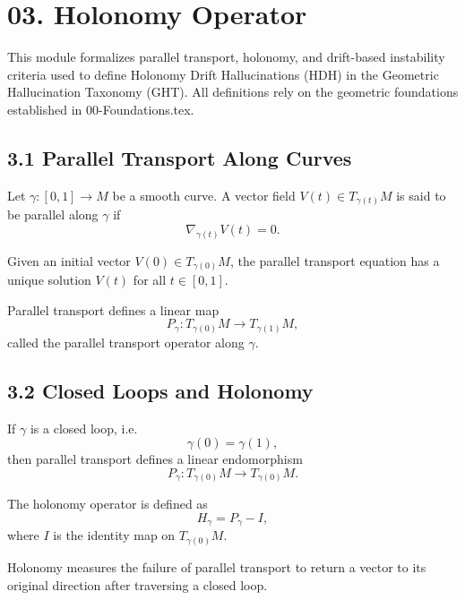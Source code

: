 
\section*{03. Holonomy Operator}

This module formalizes parallel transport, holonomy, and drift-based
instability criteria used to define Holonomy Drift Hallucinations (HDH)
in the Geometric Hallucination Taxonomy (GHT). All definitions rely on
the geometric foundations established in 00-Foundations.tex.

\subsection*{3.1 Parallel Transport Along Curves}

Let $\gamma : [0,1] \to M$ be a smooth curve. A vector field
$V(t) \in T_{\gamma(t)}M$ is said to be parallel along $\gamma$ if
\[
\nabla_{\dot{\gamma}(t)} V(t) = 0.
\]

Given an initial vector $V(0) \in T_{\gamma(0)}M$, the parallel transport
equation has a unique solution $V(t)$ for all $t \in [0,1]$.

Parallel transport defines a linear map
\[
P_\gamma : T_{\gamma(0)}M \to T_{\gamma(1)}M,
\]
called the parallel transport operator along $\gamma$.

\subsection*{3.2 Closed Loops and Holonomy}

If $\gamma$ is a closed loop, i.e.
\[
\gamma(0) = \gamma(1),
\]
then parallel transport defines a linear endomorphism
\[
P_\gamma : T_{\gamma(0)}M \to T_{\gamma(0)}M.
\]

The holonomy operator is defined as
\[
H_\gamma = P_\gamma - I,
\]
where $I$ is the identity map on $T_{\gamma(0)}M$.

Holonomy measures the failure of parallel transport to return a vector
to its original direction after traversing a closed loop.

